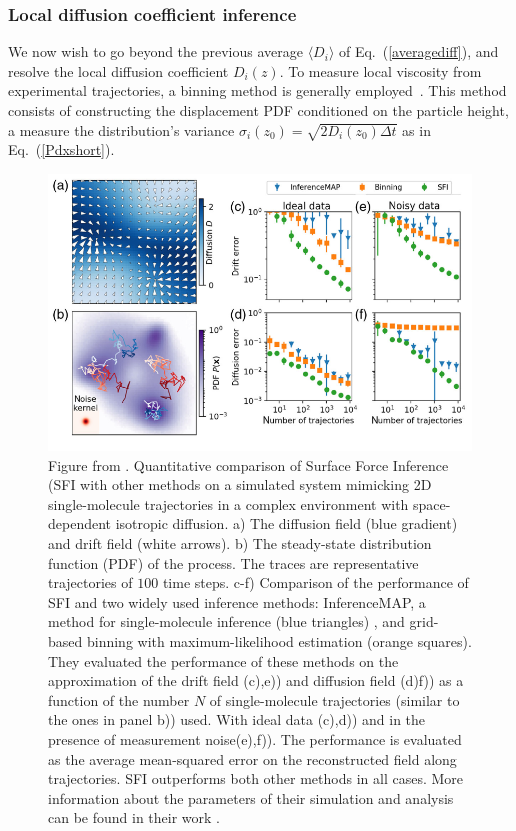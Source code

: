 \subsubsection{Local diffusion coefficient inference}

We now wish to go beyond the previous average $\langle D_i\rangle$ of Eq.~(\ref{averagediff}), and resolve the local diffusion coefficient $D_i(z)$. To measure local viscosity from experimental trajectories, a binning method is generally employed~\cite{friedrich_approaching_2011}. This method consists of constructing the displacement \gls{PDF} conditioned on the particle height, a measure the distribution's variance $\sigma_i(z_0) = \sqrt{2D_i (z_0) \Delta t}$ as in Eq.~(\ref{Pdxshort}). 


\begin{figure}[h!]
	\centering
	\includegraphics[scale=0.6]{02_body/chapter3/images/diffusion_coefficient/figure_Ronceray.png}
	\caption{Figure from \cite{frishman_learning_2020}. Quantitative comparison of Surface Force Inference (\gls{SFI} with other methods on a simulated system mimicking 2D single-molecule trajectories in a complex environment with space-dependent isotropic diffusion. a) The diffusion field (blue gradient) and drift field (white arrows). b) The steady-state distribution function (\gls{PDF}) of the process. The traces are representative trajectories of $100$ time steps. c-f) Comparison of the performance of \gls{SFI} and two widely used inference methods: InferenceMAP, a method for single-molecule inference (blue triangles)  \cite{beheiry_inferencemap_2015}, and grid-based binning with maximum-likelihood estimation \cite{hoze_heterogeneity_2012, friedrich_approaching_2011} (orange squares). They evaluated the performance of these methods on the approximation of the drift field (c),e)) and diffusion field (d)f)) as a function of the number $N$ of single-molecule trajectories (similar to the ones in panel b)) used. With ideal data (c),d)) and in the presence of measurement noise(e),f)). The performance is evaluated as the average mean-squared error on the reconstructed field along trajectories. \gls{SFI} outperforms both other methods in all cases. More information about the parameters of their simulation and analysis can be found in their work \cite{frishman_learning_2020}.}
	\label{fig.ronceray}
\end{figure}

